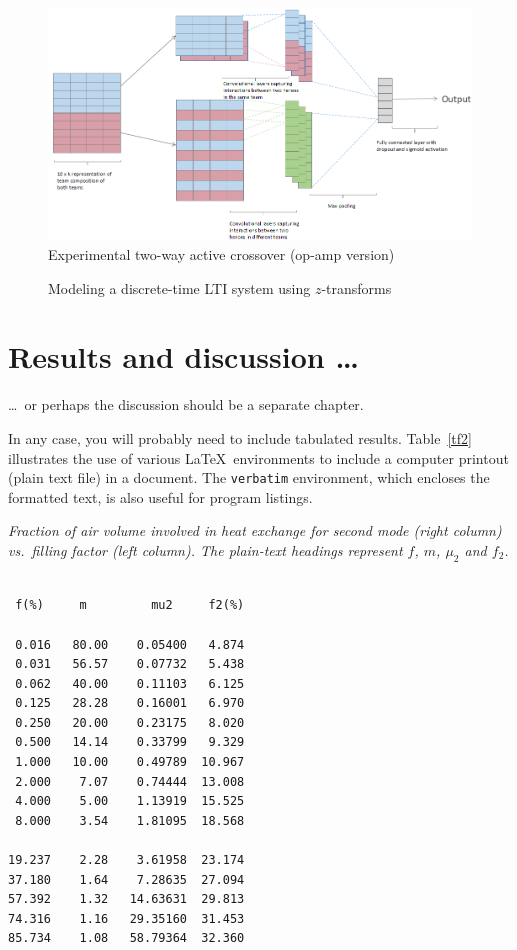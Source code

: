 \documentclass[12pt,openany,a4paper]{book}
\renewcommand{\baselinestretch}{1.2}	%
\newcommand{\tab}[1]  {Table~\ref{#1}}		%
\begin{document}
\begin{figure}[htbp]
\centerline{\includegraphics{architecture.png}}
\caption{Experimental two-way active crossover (op-amp version)}
\label{flr1}
\end{figure}

\begin{figure}[htbp]
\caption{Modeling a discrete-time LTI system using $z$-transforms}
\label{fzsys}
\end{figure}

\chapter{Results and discussion \ldots}

\ldots\ or perhaps the discussion should be a separate chapter.

In any case, you will probably need to include tabulated results.
\tab{tf2} illustrates the use of various \LaTeX\ environments to
include a computer printout (plain text file) in a document.  The
\texttt{verbatim} environment, which encloses the formatted text, is
also useful for program listings.

\begin{table}\renewcommand{\baselinestretch}{1.0}
\caption{\sl Fraction of air volume involved in heat exchange for
second mode (right column) vs.\ filling factor (left column).  The
plain-text headings represent $f$, $m$, $\mu_2$ and $f_2$.}
\label{tf2}

\begin{center}
\begin{minipage}[c]{2.85in}\small\normalsize
\begin{verbatim}

 f(%)     m         mu2     f2(%)

 0.016   80.00    0.05400   4.874
 0.031   56.57    0.07732   5.438
 0.062   40.00    0.11103   6.125
 0.125   28.28    0.16001   6.970
 0.250   20.00    0.23175   8.020
 0.500   14.14    0.33799   9.329
 1.000   10.00    0.49789  10.967
 2.000    7.07    0.74444  13.008
 4.000    5.00    1.13919  15.525
 8.000    3.54    1.81095  18.568

19.237    2.28    3.61958  23.174
37.180    1.64    7.28635  27.094
57.392    1.32   14.63631  29.813
74.316    1.16   29.35160  31.453
85.734    1.08   58.79364  32.360
\end{verbatim}
\end{minipage}
\end{center}
\end{table}
\end{document}
